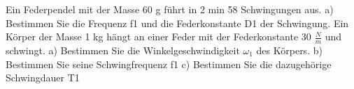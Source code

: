 \documentclass{article}
\begin{document}
Ein Federpendel mit der Masse 60 g führt in 2 min 58 Schwingungen aus.
a) Bestimmen Sie die Frequenz f1 und die Federkonstante D1 der Schwingung.
Ein Körper der Masse 1 kg hängt an einer Feder mit der Federkonstante 30 $\frac{N}{m}$ und schwingt.
a) Bestimmen Sie die Winkelgeschwindigkeit $\omega _1$ des Körpers.
b) Bestimmen Sie seine Schwingfrequenz f1
c) Bestimmen Sie die dazugehörige Schwingdauer T1
\end{document}
